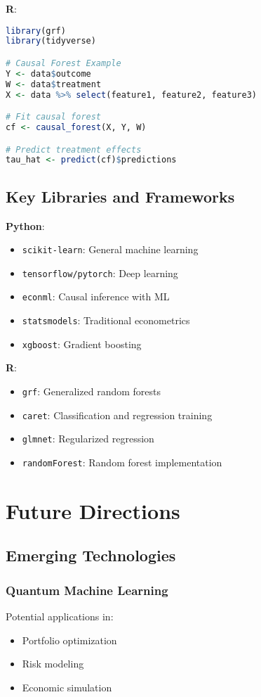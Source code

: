 \documentclass[12pt,a4paper]{article}
\begin{document}
\textbf{R}:
\begin{lstlisting}[language=R]
library(grf)
library(tidyverse)

# Causal Forest Example
Y <- data$outcome
W <- data$treatment
X <- data %>% select(feature1, feature2, feature3)

# Fit causal forest
cf <- causal_forest(X, Y, W)

# Predict treatment effects
tau_hat <- predict(cf)$predictions
\end{lstlisting}

\subsection{Key Libraries and Frameworks}

\textbf{Python}:
\begin{itemize}
    \item \texttt{scikit-learn}: General machine learning
    \item \texttt{tensorflow/pytorch}: Deep learning
    \item \texttt{econml}: Causal inference with ML
    \item \texttt{statsmodels}: Traditional econometrics
    \item \texttt{xgboost}: Gradient boosting
\end{itemize}

\textbf{R}:
\begin{itemize}
    \item \texttt{grf}: Generalized random forests
    \item \texttt{caret}: Classification and regression training
    \item \texttt{glmnet}: Regularized regression
    \item \texttt{randomForest}: Random forest implementation
\end{itemize}

\section{Future Directions}

\subsection{Emerging Technologies}

\subsubsection{Quantum Machine Learning}
Potential applications in:
\begin{itemize}
    \item Portfolio optimization
    \item Risk modeling
    \item Economic simulation
\end{itemize}
\end{document}
